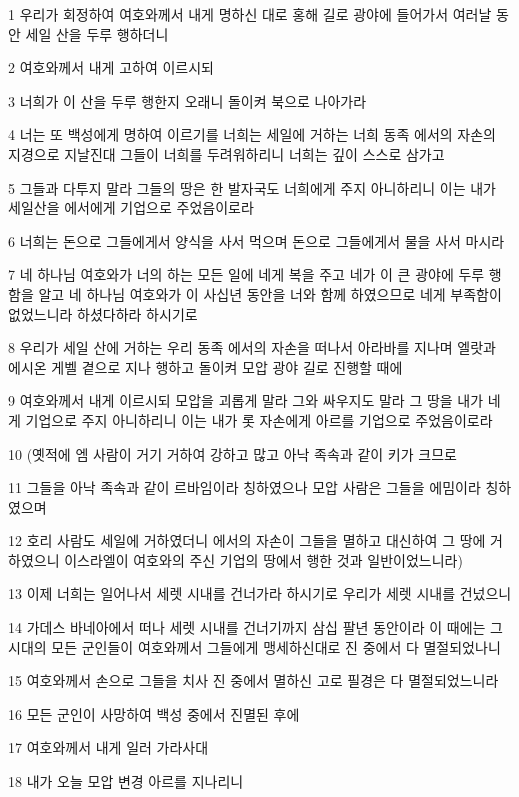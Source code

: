 \par 1 우리가 회정하여 여호와께서 내게 명하신 대로 홍해 길로 광야에 들어가서 여러날 동안 세일 산을 두루 행하더니
\par 2 여호와께서 내게 고하여 이르시되
\par 3 너희가 이 산을 두루 행한지 오래니 돌이켜 북으로 나아가라
\par 4 너는 또 백성에게 명하여 이르기를 너희는 세일에 거하는 너희 동족 에서의 자손의 지경으로 지날진대 그들이 너희를 두려워하리니 너희는 깊이 스스로 삼가고
\par 5 그들과 다투지 말라 그들의 땅은 한 발자국도 너희에게 주지 아니하리니 이는 내가 세일산을 에서에게 기업으로 주었음이로라
\par 6 너희는 돈으로 그들에게서 양식을 사서 먹으며 돈으로 그들에게서 물을 사서 마시라
\par 7 네 하나님 여호와가 너의 하는 모든 일에 네게 복을 주고 네가 이 큰 광야에 두루 행함을 알고 네 하나님 여호와가 이 사십년 동안을 너와 함께 하였으므로 네게 부족함이 없었느니라 하셨다하라 하시기로
\par 8 우리가 세일 산에 거하는 우리 동족 에서의 자손을 떠나서 아라바를 지나며 엘랏과 에시온 게벨 곁으로 지나 행하고 돌이켜 모압 광야 길로 진행할 때에
\par 9 여호와께서 내게 이르시되 모압을 괴롭게 말라 그와 싸우지도 말라 그 땅을 내가 네게 기업으로 주지 아니하리니 이는 내가 롯 자손에게 아르를 기업으로 주었음이로라
\par 10 (옛적에 엠 사람이 거기 거하여 강하고 많고 아낙 족속과 같이 키가 크므로
\par 11 그들을 아낙 족속과 같이 르바임이라 칭하였으나 모압 사람은 그들을 에밈이라 칭하였으며
\par 12 호리 사람도 세일에 거하였더니 에서의 자손이 그들을 멸하고 대신하여 그 땅에 거하였으니 이스라엘이 여호와의 주신 기업의 땅에서 행한 것과 일반이었느니라)
\par 13 이제 너희는 일어나서 세렛 시내를 건너가라 하시기로 우리가 세렛 시내를 건넜으니
\par 14 가데스 바네아에서 떠나 세렛 시내를 건너기까지 삼십 팔년 동안이라 이 때에는 그 시대의 모든 군인들이 여호와께서 그들에게 맹세하신대로 진 중에서 다 멸절되었나니
\par 15 여호와께서 손으로 그들을 치사 진 중에서 멸하신 고로 필경은 다 멸절되었느니라
\par 16 모든 군인이 사망하여 백성 중에서 진멸된 후에
\par 17 여호와께서 내게 일러 가라사대
\par 18 내가 오늘 모압 변경 아르를 지나리니
